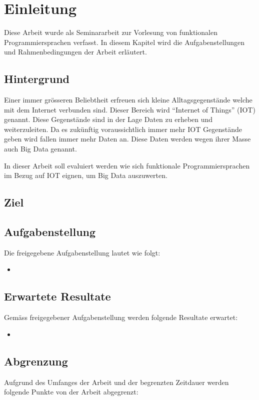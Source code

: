 
\chapter{Einleitung}
Diese Arbeit wurde als Seminararbeit zur Vorlesung von funktionalen Programmiersprachen verfasst.
In diesem Kapitel wird die Aufgabenstellungen und Rahmenbedingungen der Arbeit erläutert.

\section{Hintergrund}
Einer immer grösseren Beliebtheit erfreuen sich kleine Alltagsgegenstände welche mit dem Internet verbunden sind. Dieser Bereich wird "`Internet of Things"' (IOT) genannt. Diese Gegenstände sind in der Lage Daten zu erheben und weiterzuleiten. Da es zukünftig voraussichtlich immer mehr IOT Gegenstände geben wird fallen immer mehr Daten an. 
Diese Daten werden wegen ihrer Masse auch Big Data genannt.

In dieser Arbeit soll evaluiert werden wie sich funktionale Programmiersprachen im Bezug auf IOT eignen, um Big Data auszuwerten.


\section{Ziel}


\section{Aufgabenstellung} \label{sec:Aufgabenstellung}
Die freigegebene Aufgabenstellung lautet wie folgt:

\begin{itemize}
\item 
\end{itemize}


\section{Erwartete Resultate} \label{sec:ErwarteteResultate}
Gemäss freigegebener Aufgabenstellung werden folgende Resultate erwartet:

\begin{itemize}
\item 
\end{itemize}


\section{Abgrenzung} \label{sec:Abgrenzung}
Aufgrund des Umfanges der Arbeit und der begrenzten Zeitdauer werden folgende Punkte von der Arbeit abgegrenzt:

